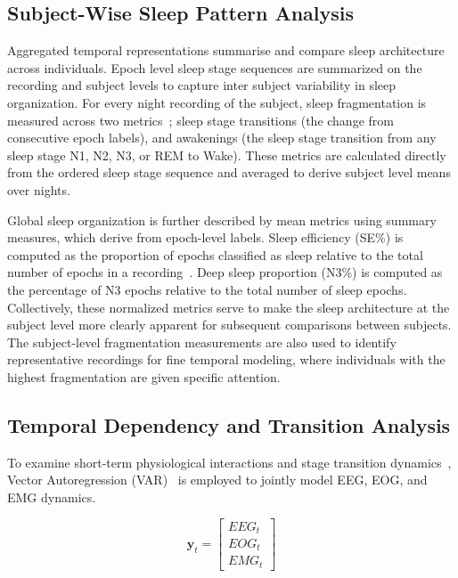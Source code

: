 \documentclass[10pt]{cai26}
\begin{document}
\subsection{Subject-Wise Sleep Pattern Analysis}

Aggregated temporal representations summarise and compare sleep architecture across individuals. Epoch level sleep stage sequences 
are summarized on the recording and subject levels to capture inter subject variability in sleep organization. For every night 
recording of the subject, sleep fragmentation is measured across two metrics~\cite{Bonnet2003Fragmentation}; sleep stage transitions (the change from consecutive 
epoch labels), and awakenings (the sleep stage transition from any sleep stage N1, N2, N3, or REM to Wake). These metrics are 
calculated directly from the ordered sleep stage sequence and averaged to derive subject level means over nights.

Global sleep organization is further described by mean metrics using summary measures, which derive from epoch-level labels. Sleep 
efficiency (SE\%) is computed as the proportion of epochs classified as sleep relative to the total number of epochs in a 
recording~\cite{Bonnet2003Fragmentation}. Deep sleep proportion (N3\%) is computed as the percentage of N3 epochs relative to the total number of sleep epochs. 
Collectively, these normalized metrics serve to make the sleep architecture at the subject level more clearly apparent for 
subsequent comparisons between subjects. The subject-level fragmentation measurements are also used to identify representative 
recordings for fine temporal modeling, where individuals with the highest fragmentation are given specific attention.

\subsection{Temporal Dependency and Transition Analysis}

To examine short-term physiological interactions and stage transition dynamics~\cite{Taguchi2000Markov}, Vector Autoregression (VAR)~\cite{Lutkepohl2005VAR} is employed to jointly model EEG, EOG, and EMG dynamics.

\begin{equation}
\mathbf{y}_t =
\begin{bmatrix}
EEG_t \\
EOG_t \\
EMG_t
\end{bmatrix}
\end{equation}
\end{document}
